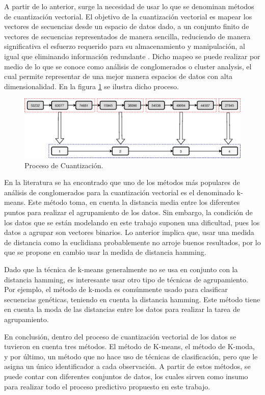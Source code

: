 A partir de lo anterior, surge la necesidad de usar lo que se denominan métodos de cuantización vectorial. El objetivo de la cuantización vectorial es mapear los vectores de secuencias desde un espacio de datos dado, a un conjunto finito de vectores de secuencias representados de manera sencilla, reduciendo de manera significativa el esfuerzo requerido para su almacenamiento y manipulación, al igual que eliminando información redundante \cite{Fink2014}. Dicho mapeo se puede realizar por medio de lo que se conoce como análisis de conglomerados o cluster analysis, el cual permite representar de una mejor manera espacios de datos con alta dimensionalidad. En la figura \ref{fig:Cuantization} se ilustra dicho proceso. 

\begin{figure}[htbp!] 
    \centering    
    \includegraphics[width=1.0\textwidth]{Chapter2/Figs/Vector/Figure_cuantization.eps}
    \caption[Proceso de Cuantización]{Proceso de Cuantización.}
    \label{fig:Cuantization}
\end{figure}

En la literatura se ha encontrado que uno de los métodos más populares de análisis de conglomerados para la cuantización vectorial es el denominado k-means. Este método toma, en cuenta la distancia media entre los diferentes puntos para realizar el agrupamiento de los datos. Sin embargo, la condición de los datos que se están modelando en este trabajo suponen una dificultad, pues los datos a agrupar son vectores binarios. Lo anterior implica que, usar una medida de distancia como la euclidiana probablemente no arroje buenos resultados, por lo que se propone en cambio usar la medida de distancia hamming. 

Dado que la técnica de k-means generalmente no se usa en conjunto con la distancia hamming, es interesante usar otro tipo de técnicas de agrupamiento. Por ejemplo, el método de k-moda es comúnmente usado para clasificar secuencias genéticas, teniendo en cuenta la distancia hamming. Este método tiene en cuenta la moda de las distancias entre los datos para realizar la tarea de agrupamiento.

En conclusión, dentro del proceso de cuantización vectorial de los datos se tuvieron en cuenta tres métodos. El método de K-means, el método de K-moda, y por último, un método que no hace uso de técnicas de clasificación, pero que le asigna un único identificador a cada observación. A partir de estos métodos, se puede contar con diferentes conjuntos de datos, los cuales sirven como insumo para realizar todo el proceso predictivo propuesto en este trabajo.

